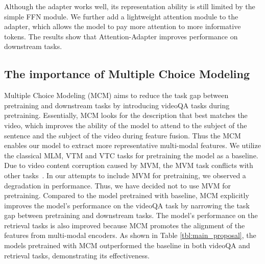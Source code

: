 \documentclass[10pt,twocolumn,letterpaper]{article}
\begin{document}
Although the adapter works well, its representation ability is still limited by the simple FFN module. We further add a lightweight attention module to the adapter, which allows the model to pay more attention to  more informative tokens. The results show that Attention-Adapter improves performance on downstream tasks.

\vspace{-1ex}
\subsection{The importance of Multiple Choice Modeling}\label{sec:exp-pfe}
\vspace{-1ex}
Multiple Choice Modeling (MCM) aims to reduce the task gap between pretraining and downstream tasks by introducing videoQA tasks during pretraining. 
Essentially, MCM looks for the description that best matches the video, which improves the ability of the model to attend to the subject of the sentence and the subject of the video during feature fusion. Thus the MCM enables our model to extract more representative multi-modal features.
We utilize the classical MLM, VTM and VTC tasks for pretraining the model as a baseline. Due to video content corruption caused by MVM, the MVM task conflicts with other tasks~\cite{Lei2021UnderstandingCV}. In our attempts to include MVM for pretraining, we observed a degradation in performance. Thus, we have decided not to use MVM for pretraining.
Compared to the model pretrained with baseline, MCM explicitly improves the model's performance on the videoQA task by narrowing the task gap between pretraining and downstream tasks.
The model's performance on the retrieval tasks is also improved because MCM promotes the alignment of the features from multi-modal encoders. 
As shown in Table \ref{tbl:main_proposal}, the models pretrained with MCM outperformed the baseline in both videoQA and retrieval tasks, demonstrating its effectiveness. 
 \vspace{-1.5ex}
\end{document}
